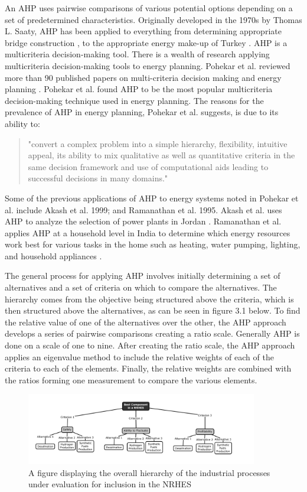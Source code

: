 \documentclass[12pt]{UIdahoMastersThesis}
\begin{document}
An AHP uses pairwise comparisons of various potential options depending on a set of predetermined characteristics. Originally developed in the 1970s by Thomas L. Saaty, AHP has been applied to everything from determining appropriate bridge construction \cite{Pan2008}, to the appropriate energy make-up of Turkey\cite{Kahraman2010} \cite{Saaty1987}. AHP is a multicriteria decision-making tool. There is a wealth of research applying multicriteria decision-making tools to energy planning. Pohekar et al. reviewed more than 90 published papers on multi-criteria decision making and energy planning \cite{Pohekar2004}. Pohekar et al. found AHP to be the most popular multicriteria decision-making technique used in energy planning. The reasons for the prevalence of AHP in energy planning, Pohekar et al. suggests, is due to its ability to: 
\begin{quote}
	"convert a complex problem into a simple hierarchy, flexibility, intuitive appeal, its ability to mix qualitative as well as quantitative criteria in the same decision framework and use of computational aids leading to successful decisions in many domains.\cite{Pohekar2004}"
 \end{quote}
Some of the previous applications of AHP to energy systems noted in Pohekar et al. include Akash et al.  1999; and Ramanathan et al. 1995. Akash et al. uses AHP to analyze the selection of power plants in Jordan \cite{Akash1999}.  Ramanathan et al. applies AHP at a household level in India to determine which energy resources work best for various tasks in the home such as heating, water pumping, lighting, and household appliances \cite{Ramanathan1995}.  

The general process for applying AHP involves initially determining a set of alternatives and a set of criteria on which to compare the alternatives. The hierarchy comes from the objective being structured above the criteria, which is then structured above the alternatives, as can be seen in figure 3.1 below. To find the relative value of one of the alternatives over the other, the AHP approach develops a series of pairwise comparisons creating a ratio scale.  Generally AHP is done on a scale of one to nine. After creating the ratio scale, the AHP approach applies an eigenvalue method to include the relative weights of each of the criteria to each of  the elements. Finally, the relative weights are combined with the ratios forming one measurement to compare the various elements.

\begin{figure}[h!]
  \centering
  \includegraphics[width=0.9\textwidth]{AHP_hierarchy.PNG}
  \caption{A figure displaying the overall hierarchy of the industrial processes under evaluation for inclusion in the NRHES}
\end{figure}
\end{document}

